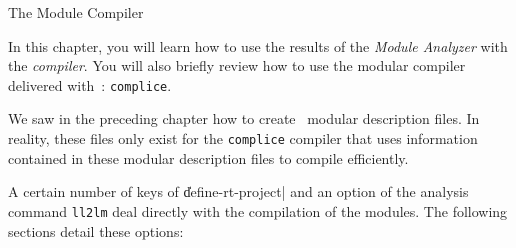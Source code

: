 {The Module Compiler}

In this chapter, you will learn how to use the results of the {\em Module Analyzer} with the {\em compiler}.
You will also briefly review how to use the modular compiler delivered
with \LeLisp\,:  {\tt complice}.


We saw in the preceding chapter how to create \LeLisp\ modular description files.  In reality, these files only exist for the {\tt complice} compiler that uses information contained in these modular description files to compile efficiently. 


A certain number of keys of \|define-rt-project| and an option of the analysis command {\tt ll2lm} deal directly with the compilation of the modules.  The following sections detail these options:

